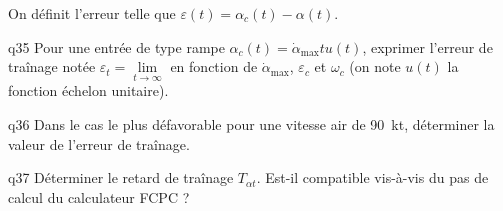 \begin{multicols}{2}
On définit l’erreur telle que $\varepsilon(t)=\alpha_c(t)-\alpha(t)$.




{\begin{question}{q35}
Pour une entrée de type rampe $\alpha_c(t)=\dot{\alpha}_\text{max} tu(t)$, exprimer l’erreur de traînage notée $\varepsilon_t =\lim \limits_{t\to \infty}$ en fonction 
de $\dot{\alpha}_{\text{max}}$, $\varepsilon_c$ et $\omega_c$ (on note $u(t)$ la fonction échelon unitaire).
\ifprof
\begin{corrige}
\end{corrige}
\else
\fi
\begin{reponses}
\end{reponses} \end{question}}  


{\begin{question}{q36}
Dans le cas le plus défavorable pour une vitesse air de \SI{90}{kt}, déterminer la valeur de l’erreur de traînage.
\ifprof
\begin{corrige}
\end{corrige}
\else
\fi
\begin{reponses}
\end{reponses} \end{question}}  


{\begin{question}{q37}
Déterminer le retard de traînage $T_{\alpha t}$. Est-il compatible vis-à-vis du pas de calcul du calculateur FCPC ?
\ifprof
\begin{corrige}
\end{corrige}
\else
\fi
\begin{reponses}
\end{reponses} \end{question}}  



\end{multicols}
